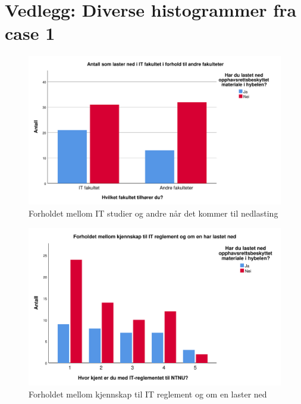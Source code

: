 \chapter{Vedlegg: Diverse histogrammer fra case 1}
\label{vedlegg:histogrammer}

\begin{figure}[H]
    \centering
    \includegraphics[scale=0.45]{case_1/bilder/IT_lasterned.pdf}
    \caption[Forskjellen mellom fakultetene og om de laster ned]{Forholdet mellom IT studier og andre når det kommer til nedlasting}
    \label{fig:IT-lasterned}
\end{figure}

\begin{figure}[H]
    \centering
    \includegraphics[scale=0.45]{case_1/bilder/reglement_lasterned.pdf}
    \caption[Forholdet mellom kjennskap til IT reglement og om de laster ned]{Forholdet mellom kjennskap til IT reglement og om en laster ned}
    \label{fig:reglement-lasterned}
\end{figure}

